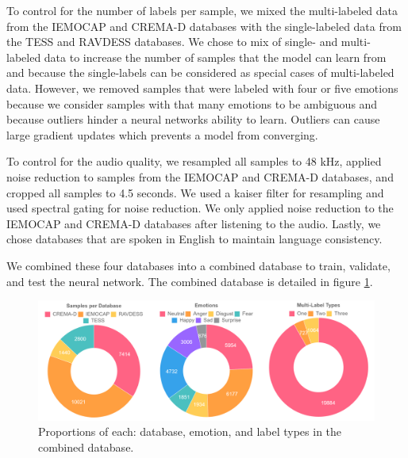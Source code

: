 \documentclass[conference]{IEEEtran}
\begin{document}
To control for the number of labels per sample, we mixed the multi-labeled data from the IEMOCAP and CREMA-D databases with the single-labeled data from the TESS and RAVDESS databases. We chose to mix of single- and multi- labeled data to increase the number of samples that the model can learn from and because the single-labels can be considered as special cases of multi-labeled data. However, we removed samples that were labeled with four or five emotions because we consider samples with that many emotions to be ambiguous and because outliers hinder a neural networks ability to learn. Outliers can cause large gradient updates which prevents a model from converging.

To control for the audio quality, we resampled all samples to 48 kHz, applied noise reduction to samples from the IEMOCAP and CREMA-D databases, and cropped all samples to 4.5 seconds. We used a kaiser filter for resampling and used spectral gating for noise reduction. We only applied noise reduction to the IEMOCAP and CREMA-D databases after listening to the audio. Lastly, we chose databases that are spoken in English to maintain language consistency.

We combined these four databases into a combined database to train, validate, and test the neural network. The combined database is detailed in figure \ref{fig:combined_db}.

\begin{figure}[t]
	\centering
	\hspace{6mm}
	\includegraphics[width=\textwidth]{combined_db.png} 
	\caption{Proportions of each: database, emotion, and label types in the combined database.}
	\label{fig:combined_db}
\end{figure}
\end{document}
